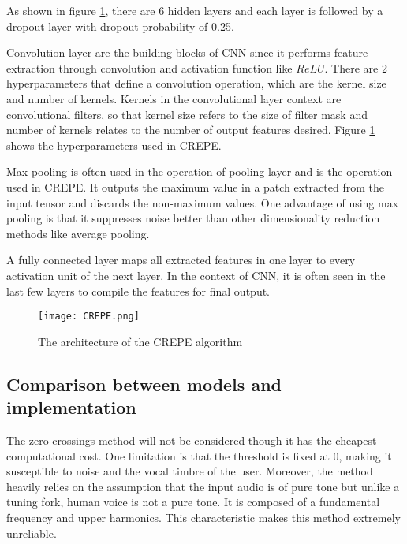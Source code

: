 \begin{enumerate}
	As shown in figure \ref{CREPE}, there are 6 hidden layers and each layer is followed by a dropout layer with dropout probability of 0.25. 

	Convolution layer are the building blocks of CNN since it performs feature extraction through convolution and activation function like $ReLU$.
	There are 2 hyperparameters that define a convolution operation, which are the kernel size and number of kernels. Kernels in the convolutional layer context are convolutional
	filters, so that kernel size refers to the size of filter mask and number of kernels relates to the number of output features desired. Figure \ref{CREPE} shows the hyperparameters
	used in CREPE.

	Max pooling is often used in the operation of pooling layer and is the operation used in CREPE. It outputs the maximum value in a patch extracted from the
	input tensor and discards the non-maximum values. 
	One advantage of using max pooling is that it suppresses noise better than other dimensionality reduction methods like average pooling.

	A fully connected layer maps all extracted features in one layer to every activation unit of the next layer. In the context of CNN, it is often seen in the
	last few layers to compile the features for final output.

	\begin{figure}
		\centering
		\texttt{[image: CREPE.png]}
		\caption{The architecture of the CREPE algorithm}
		\label{CREPE}
	\end{figure}

\end{enumerate}

\subsection{Comparison between models and implementation}
The zero crossings method will not be considered though it has the cheapest computational cost. One limitation is that
the threshold is fixed at 0, making it susceptible to noise and the vocal timbre of the user. Moreover, the method heavily relies on
the assumption that the input audio is of pure tone but unlike a tuning fork, human voice is not a pure tone. It is 
composed of a fundamental frequency and upper harmonics.  This characteristic makes this method extremely
unreliable.

